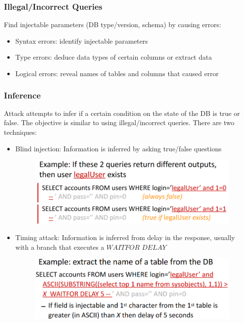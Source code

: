 \documentclass[10pt,a4paper]{report}
\begin{document}
\subsubsection{Illegal/Incorrect Queries}
Find injectable parameters (DB type/version, schema) by causing errors:
\begin{itemize}
\item Syntax errors: identify injectable parameters
\item Type errors: deduce data types of certain columns or extract data
\item Logical errors: reveal names of tables and columns that caused error
\end{itemize}
\subsubsection{Inference}
Attack attempts to infer if a certain condition on the state of the DB is true or false. The objective is similar to using illegal/incorrect queries. There are two techniques:
\begin{itemize}
\item Blind injection: Information is inferred by asking true/false questions
\begin{figure}[H]
\centering
\includegraphics[scale=0.4]{10.png}
\end{figure}
\item Timing attack: Information is inferred from delay in the response, usually with a branch that executes a $WAITFOR$ $DELAY$
\begin{figure}[H]
\centering
\includegraphics[scale=0.4]{11.png}
\end{figure}
\end{itemize}
\end{document}
